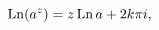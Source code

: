 \[\mathop{\mathrm{Ln}\/}\nolimits\!\left(a^{z}\right)=z\mathop{\mathrm{Ln}\/}%
\nolimits a+2k\pi i,\]